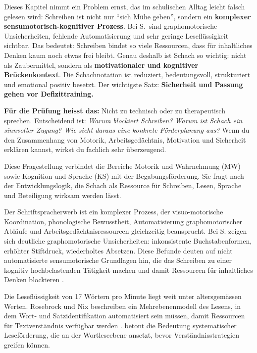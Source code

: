 \documentclass[ngerman, a4paper]{article}
\begin{document}
\begin{kapitelueberblick}
Dieses Kapitel nimmt ein Problem ernst, das im schulischen Alltag leicht falsch gelesen wird: Schreiben ist nicht nur \enquote{sich Mühe geben}, sondern ein \textbf{komplexer sensumotorisch-kognitiver Prozess}. Bei S.\ sind graphomotorische Unsicherheiten, fehlende Automatisierung und sehr geringe Leseflüssigkeit sichtbar. Das bedeutet: Schreiben bindet so viele Ressourcen, dass für inhaltliches Denken kaum noch etwas frei bleibt. Genau deshalb ist Schach so wichtig: nicht als Zaubermittel, sondern als \textbf{motivationaler und kognitiver Brückenkontext}. Die Schachnotation ist reduziert, bedeutungsvoll, strukturiert und emotional positiv besetzt. Der wichtigste Satz: \textbf{Sicherheit und Passung gehen vor Defizittraining.}

\medskip\textbf{Für die Prüfung heisst das:} Nicht zu technisch oder zu therapeutisch sprechen. Entscheidend ist: \textit{Warum blockiert Schreiben? Warum ist Schach ein sinnvoller Zugang? Wie sieht daraus eine konkrete Förderplanung aus?} Wenn du den Zusammenhang von Motorik, Arbeitsgedächtnis, Motivation und Sicherheit erklären kannst, wirkst du fachlich sehr überzeugend.
\end{kapitelueberblick}
 
Diese Fragestellung verbindet die Bereiche Motorik und Wahrnehmung (MW) sowie
Kognition und Sprache (KS) mit der Begabungsförderung. Sie fragt nach der
Entwicklungslogik, die Schach als Ressource für Schreiben, Lesen, Sprache und
Beteiligung wirksam werden lässt.
 
Der Schriftspracherwerb ist ein komplexer Prozess, der visuo-motorische Koordination,
phonologische Bewusstheit, Automatisierung graphomotorischer Abläufe und
Arbeitsgedächtnisressourcen gleichzeitig beansprucht. Bei S. zeigen sich deutliche
graphomotorische Unsicherheiten: inkonsistente Buchstabenformen, erhöhter Stiftdruck,
wiederholtes Absetzen. Diese Befunde deuten auf nicht automatisierte sensumotorische
Grundlagen hin, die das Schreiben zu einer kognitiv hochbelastenden Tätigkeit machen
und damit Ressourcen für inhaltliches Denken blockieren
\parencite{rosebrock2010grundlagen,gold2018lesenkannmanlernen}.
 
Die Leseflüssigkeit von 17 Wörtern pro Minute liegt weit unter altersgemässen Werten.
Rosebrock und Nix beschreiben ein Mehrebenenmodell des Lesens, in dem Wort- und
Satzidentifikation automatisiert sein müssen, damit Ressourcen für Textverständnis
verfügbar werden \parencite{rosebrock2010grundlagen}. \textcite{gold2018lesenkannmanlernen} betont die Bedeutung
systematischer Leseförderung, die an der Wortleseebene ansetzt, bevor
Verständnisstrategien greifen können.
 
\end{document}

